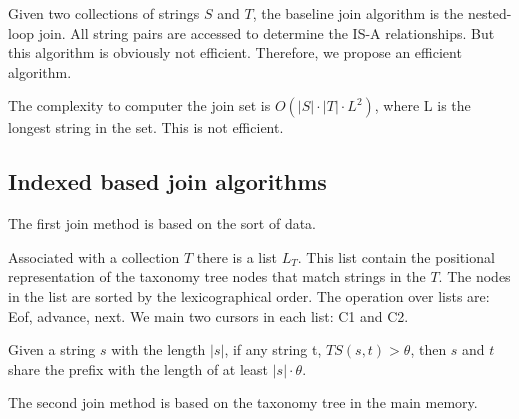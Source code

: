 Given two collections of strings $S$ and $T$, the baseline join algorithm is the nested-loop join. All string pairs are accessed to determine the IS-A relationships. But this algorithm is obviously not efficient. Therefore, we propose an efficient algorithm.

The complexity to computer the join set is $O(|S| \cdot |T| \cdot L^2)$, where L is the longest string in the set. This is not efficient.


\subsection{Indexed based join algorithms}

The first join method is based on the sort of data.

Associated with a collection $T$ there is a list $L_T$. This list contain the positional representation of the taxonomy tree nodes that match strings in the $T$. The nodes in the list are sorted by the lexicographical order. The operation over lists are: Eof, advance, next.
We main two cursors in each list: C1 and C2.

\begin{lem} Given a string $s$ with the length $|s|$, if any string t, $TS(s,t) > \theta$, then $s$ and $t$ share the prefix with the length of at least $|s| \cdot \theta $.
\end{lem}

The second join method is based on the taxonomy tree in the main memory.

